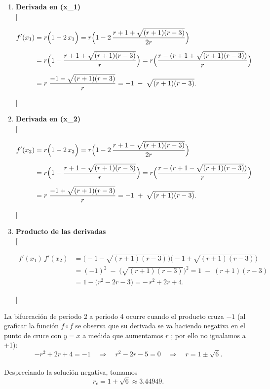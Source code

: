 \documentclass[
  10pt,
  a4paper,
  DIV=11,
  numbers=noendperiod,
  open=any]{scrreprt}
\numberwithin{equation}{chapter}
\numberwithin{equation}{chapter}
\renewcommand{\[}{\begin{equation}}
\renewcommand{\]}{\end{equation}}
\begin{document}
\begin{enumerate}
\def\labelenumi{\arabic{enumi}.}
\item
  \textbf{Derivada en (x\_1)}\\
  {[}

  \begin{align*}
  f'(x_1)
  &= r\Bigl(1 - 2\,x_1\Bigr)
  = r\Bigl(1 - 2\,\frac{r+1 + \sqrt{(r+1)(r-3)}}{2r}\Bigr) \\[6pt]
  &= r\Bigl(1 - \frac{r+1 + \sqrt{(r+1)(r-3)}}{r}\Bigr)
  = r\Bigl(\frac{r - (r+1 + \sqrt{(r+1)(r-3)})}{r}\Bigr) \\[6pt]
  &= r\;\frac{-1 - \sqrt{(r+1)(r-3)}}{r}
  = -1 \;-\;\sqrt{(r+1)(r-3)}.
  \end{align*}

  {]}
\item
  \textbf{Derivada en (x\_2)}\\
  {[}

  \begin{align*}
  f'(x_2)
  &= r\Bigl(1 - 2\,x_2\Bigr)
  = r\Bigl(1 - 2\,\frac{r+1 - \sqrt{(r+1)(r-3)}}{2r}\Bigr) \\[6pt]
  &= r\Bigl(1 - \frac{r+1 - \sqrt{(r+1)(r-3)}}{r}\Bigr)
  = r\Bigl(\frac{r - (r+1 - \sqrt{(r+1)(r-3)})}{r}\Bigr) \\[6pt]
  &= r\;\frac{-1 + \sqrt{(r+1)(r-3)}}{r}
  = -1 \;+\;\sqrt{(r+1)(r-3)}.
  \end{align*}

  {]}
\item
  \textbf{Producto de las derivadas}\\
  {[}

  \begin{align*}
  f'(x_1)\,f'(x_2)
  &= \bigl(-1 - \sqrt{(r+1)(r-3)}\bigr)
     \bigl(-1 + \sqrt{(r+1)(r-3)}\bigr) \\[6pt]
  &= (-1)^2 \;-\;\bigl(\sqrt{(r+1)(r-3)}\bigr)^2
  = 1 \;-\;(r+1)(r-3) \\[4pt]
  &= 1 - \bigl(r^2 - 2r - 3\bigr)
  = -\,r^2 + 2r + 4.
  \end{align*}

  {]}
\end{enumerate}

La bifurcación de periodo 2 a periodo 4 ocurre cuando el producto cruza
\(-1\) (al graficar la función \(f \circ f\) se observa que su derivada
se va haciendo negativa en el punto de cruce con \(y=x\) a medida que
aumentamos \(r\) ; por ello no igualamos a +1): \[
-r^2 + 2r + 4 = -1
\quad\Longrightarrow\quad
r^2 - 2r - 5 = 0
\quad\Longrightarrow\quad
r = 1 \pm \sqrt{6}.
\]\\
Despreciando la solución negativa, tomamos\\
\[
r_c = 1 + \sqrt{6} \approx 3.44949.
\]
\end{document}
